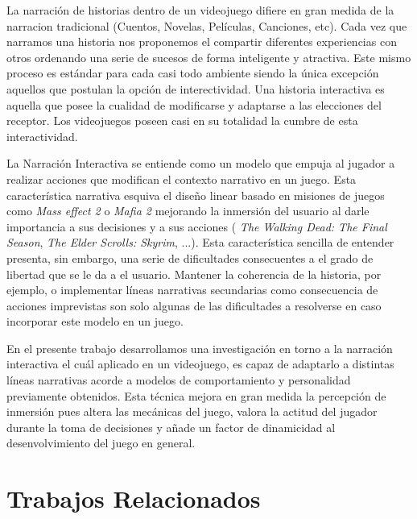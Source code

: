 \documentclass[conference]{IEEEtran}
\begin{document}
La narración de historias dentro de un videojuego difiere en gran medida de la narracion tradicional (Cuentos, Novelas, Películas, Canciones, etc). Cada vez que narramos una historia nos proponemos el compartir diferentes experiencias con otros ordenando una serie de sucesos de forma inteligente y atractiva. Este mismo proceso es estándar para cada casi todo ambiente siendo la única excepción aquellos que postulan la opción de interectividad.  Una historia interactiva es aquella que posee la cualidad de modificarse y adaptarse a las elecciones del receptor. Los videojuegos poseen casi en su totalidad la cumbre de esta interactividad.

La Narración Interactiva se entiende como un modelo que empuja al jugador a realizar acciones que modifican el contexto narrativo en un juego. Esta característica narrativa esquiva el diseño linear basado en misiones de juegos como \textit{Mass effect 2} o \textit{Mafia 2 }  mejorando la inmersión del usuario al darle importancia a sus decisiones  y a sus acciones ( \textit{The Walking Dead: The Final Season}, \textit{The Elder Scrolls: Skyrim}, ...). Esta característica sencilla de entender presenta, sin embargo, una serie de dificultades consecuentes a el grado de libertad que se le da a el usuario. Mantener la coherencia de la historia, por ejemplo, o implementar líneas narrativas secundarias como consecuencia de acciones imprevistas son solo algunas de las dificultades a resolverse en caso incorporar este modelo en un juego. 

En el presente trabajo desarrollamos una investigación en torno a la narración interactiva el cuál aplicado en un videojuego, es capaz de adaptarlo a distintas líneas narrativas acorde a modelos de comportamiento y personalidad previamente obtenidos. Esta técnica mejora en gran medida la percepción de inmersión pues altera las mecánicas del juego, valora la actitud del jugador durante la toma de decisiones y añade un factor de dinamicidad al desenvolvimiento del juego en general.

\section{Trabajos Relacionados}
\end{document}
